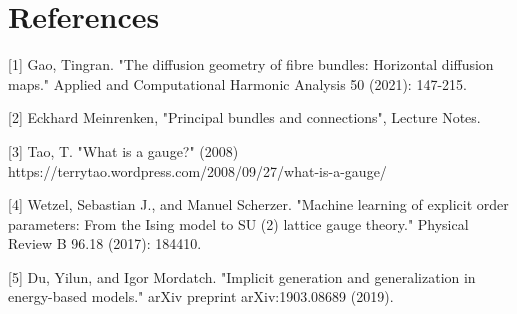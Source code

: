 \documentclass{article}
\begin{document}

\section*{References}

\small

[1] Gao, Tingran. "The diffusion geometry of fibre bundles: Horizontal diffusion maps." Applied and Computational Harmonic Analysis 50 (2021): 147-215.

[2] Eckhard Meinrenken, "Principal bundles and connections", Lecture Notes. 

[3] Tao, T. "What is a gauge?" (2008) https://terrytao.wordpress.com/2008/09/27/what-is-a-gauge/

[4] Wetzel, Sebastian J., and Manuel Scherzer. "Machine learning of explicit order parameters: From the Ising model to SU (2) lattice gauge theory." Physical Review B 96.18 (2017): 184410.


[5] Du, Yilun, and Igor Mordatch. "Implicit generation and generalization in energy-based models." arXiv preprint arXiv:1903.08689 (2019).
\end{document}
